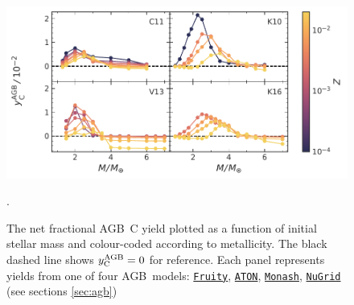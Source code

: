 \documentclass[fleqn,
usenatbib]{mnras}
\newcommand{\fruity}{\texttt{\hyperlink{fruity}{Fruity}}}
\newcommand{\nugrid}{\texttt{\hyperlink{nugrid}{NuGrid}}}
\newcommand{\monash}{\texttt{\hyperlink{monash}{Monash}}}
\newcommand{\aton}{\texttt{\hyperlink{aton}{ATON}}}
\newcommand{\agb}{AGB}
\newcommand{\Ycagb}{{y_{\rm C}^{\rm AGB}}}
\begin{document}
\begin{figure}
    \centering
 	    \includegraphics[scale=1]{agb_yields.pdf}
        \caption[]{The net fractional \agb\ C yield  plotted as a function of initial stellar mass and colour-coded according to metallicity. The black dashed line shows $\Ycagb=0$ for reference. Each panel represents yields from one of four \agb\ models: \fruity{}, \aton{}, \monash{}, \nugrid{} (see sections \ref{sec:agb}) }.

        \label{fig:y_agb}
\end{figure}
\end{document}
